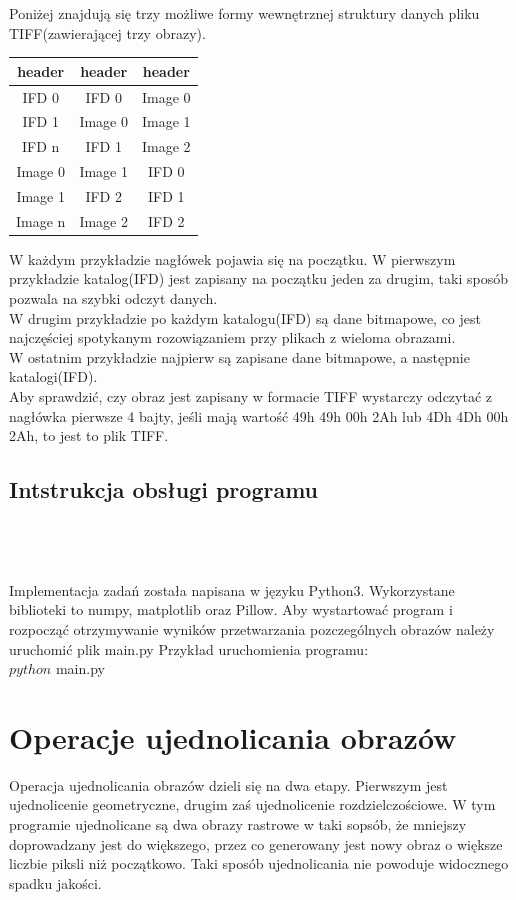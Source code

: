 \documentclass[final,a4paper,openany,12pt]{mwbk}
\begin{document}
Poniżej znajdują się trzy możliwe formy wewnętrznej struktury danych pliku TIFF(zawierającej trzy obrazy).
\begin{center}
	\begin{tabular}{|c|c|c|}
		\hline
		header & header & header\\
		\hline
		IFD 0 & IFD 0 & Image 0\\
		\hline
		IFD 1 & Image 0 & Image 1\\
		\hline
		IFD n & IFD 1 & Image 2\\
		\hline
		Image 0 & Image 1 & IFD 0\\
		\hline
		Image 1 & IFD 2 & IFD 1\\
		\hline
		Image n & Image 2 & IFD 2\\
		\hline
	\end{tabular}
\end{center}
W każdym przykładzie nagłówek pojawia się na początku.
W pierwszym przykładzie katalog(IFD) jest zapisany na początku jeden za drugim, taki sposób pozwala na szybki odczyt danych.\\
W drugim przykładzie po każdym katalogu(IFD) są dane bitmapowe, co jest najczęściej spotykanym rozowiązaniem przy plikach z wieloma obrazami.\\
W ostatnim przykładzie najpierw są zapisane dane bitmapowe, a następnie katalogi(IFD).\\
Aby sprawdzić, czy obraz jest zapisany w formacie TIFF wystarczy odczytać z nagłówka pierwsze 4 bajty, jeśli mają wartość 49h 49h 00h 2Ah lub 4Dh 4Dh 00h 2Ah, to jest to plik TIFF.

\section {Intstrukcja obsługi programu}
\hfill\\
\\\\
\indent
Implementacja zadań została napisana w języku Python3. Wykorzystane biblioteki to numpy, matplotlib oraz
Pillow. Aby wystartować program i rozpocząć otrzymywanie wyników przetwarzania pozczególnych obrazów należy uruchomić plik main.py
Przykład uruchomienia programu:\\
$python$ main.py


\chapter{Operacje ujednolicania obrazów}
Operacja ujednolicania obrazów dzieli się na dwa etapy. Pierwszym jest ujednolicenie geometryczne, drugim zaś ujednolicenie rozdzielczościowe. W tym programie ujednolicane są dwa obrazy rastrowe w taki sopsób, że mniejszy doprowadzany jest do większego, przez co generowany jest nowy obraz o większe liczbie piksli niż początkowo. Taki sposób ujednolicania nie powoduje widocznego spadku jakości.
\newpage
\end{document}
